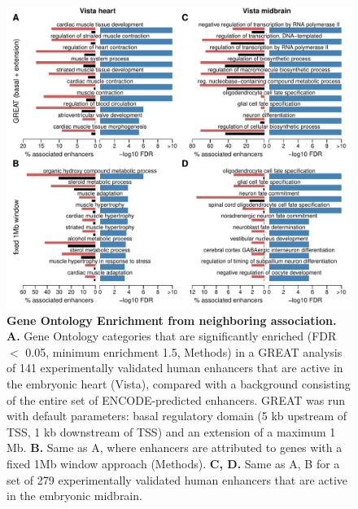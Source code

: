\begin{figure}[hbt!]
    \centering
    \includegraphics[width=1\textwidth, page=1] {figures/GOntact/Figure2.pdf}
    \caption[Gene Ontology Enrichment from neighboring association.]{
    \textbf{Gene Ontology Enrichment from neighboring association.}
    \textbf{A.} Gene Ontology categories that are significantly enriched (FDR $<$ 0.05, minimum enrichment 1.5, Methods) in a GREAT analysis of 141 experimentally validated human enhancers that are active in the embryonic heart (Vista), compared with a background consisting of the entire set of ENCODE-predicted enhancers. GREAT was run with default parameters: basal regulatory domain (5 kb upstream of TSS, 1 kb downstream of TSS) and an extension of a maximum 1 Mb. 
    \textbf{B.} Same as A, where enhancers are attributed to genes with a fixed 1Mb window approach (Methods). 
    \textbf{C, D.} Same as A, B for a set of 279 experimentally validated human enhancers that are active in the embryonic midbrain. 
    \\
    }
    \label{fig:GOntact-fig2}
\end{figure} 

